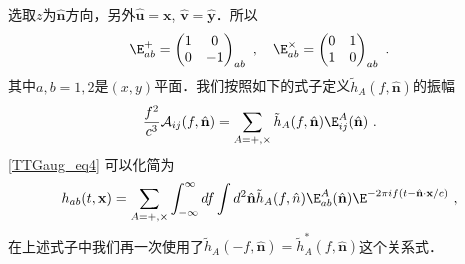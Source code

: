 选取$z$为$\hat{ \mathbf n }$方向，另外$\hat{ \mathbf u }=\mathbf x$, $\hat{ \mathbf v } = \hat{ \mathbf y }$．所以
\begin{equation}
\E^+_{ab} = \begin{pmatrix}
1 & 0 \\
0 & -1 
\end{pmatrix}_{ab}~, \quad \E^\times_{ab} = \begin{pmatrix}
0 & 1 \\
1 & 0 
\end{pmatrix}_{ab}~.
\end{equation}
其中$a,b = 1,2$是$(x,y)$平面．我们按照如下的式子定义$\tilde h_A(f,\hat{ {\mathbf n} })$的振幅
\begin{equation}
\frac{f^2}{c^3} \mathcal A_{ij} (f,\hat{ \mathbf n }) = \sum_{A = +,\times} \tilde h_{A} (f, \hat{  {\mathbf n} } ) \E^A_{ij} (\hat{ {\mathbf n} } )~.
\end{equation}
\autoref{TTGaug_eq4} 可以化简为
\begin{equation}
h_{ab}(t,\mathbf x) = \sum_{A = +,\times} \int_{-\infty}^{\infty} df \int d^2 \hat{\mathbf n } \tilde h_A (f, \hat{ n }  ) \E^A_{ab} ( \hat{ \mathbf n } ) \E^{-2 \pi i f (t - \hat{ \mathbf n }\cdot {\mathbf x}/c )}~,
\end{equation}
在上述式子中我们再一次使用了$\tilde h_A (-f, \hat{ \mathbf n } ) = \tilde h_A^* (f, \hat{ \mathbf n }) $这个关系式．






 


 

















